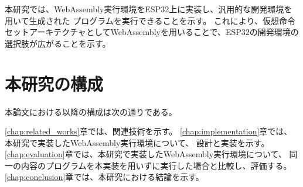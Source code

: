 本研究では、WebAssembly実行環境をESP32上に実装し、汎用的な開発環境を用いて生成された
プログラムを実行できることを示す。
これにより、仮想命令セットアーキテクチャとしてWebAssemblyを用いることで、ESP32の開発環境の
選択肢が広がることを示す。

\section{本研究の構成}

本論文における以降の構成は次の通りである。

\ref{chap:related_works}章では、関連技術を示す。
\ref{chap:implementation}章では、本研究で実装したWebAssembly実行環境について、
設計と実装を示す。
\ref{chap:evaluation}章では、本研究で実装したWebAssembly実行環境について、
同一の内容のプログラムを本実装を用いずに実行した場合と比較し、評価する。
\ref{chap:conclusion}章では、本研究における結論を示す。
